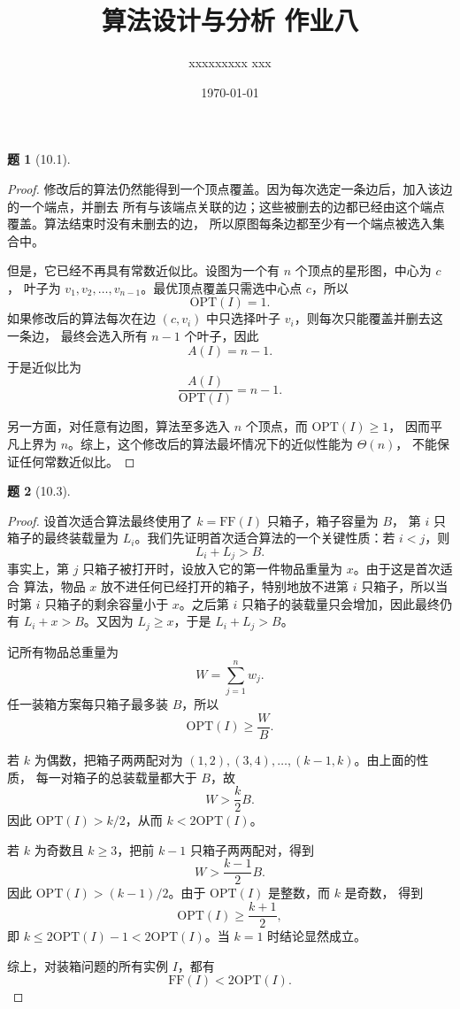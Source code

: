 \documentclass[11pt, a4paper]{article}
\title{算法设计与分析 作业八}
\author{xxxxxxxxx xxx}
\date{\today}
\newtheorem{problem}{题}
\begin{document}
\maketitle

\begin{problem}[10.1]
\end{problem}

\begin{proof}
    修改后的算法仍然能得到一个顶点覆盖。因为每次选定一条边后，加入该边的一个端点，并删去
    所有与该端点关联的边；这些被删去的边都已经由这个端点覆盖。算法结束时没有未删去的边，
    所以原图每条边都至少有一个端点被选入集合中。

    但是，它已经不再具有常数近似比。设图为一个有 $n$ 个顶点的星形图，中心为 $c$，
    叶子为 $v_1,v_2,\ldots,v_{n-1}$。最优顶点覆盖只需选中心点 $c$，所以
    \[
        \mathrm{OPT}(I)=1.
    \]
    如果修改后的算法每次在边 $(c,v_i)$ 中只选择叶子 $v_i$，则每次只能覆盖并删去这一条边，
    最终会选入所有 $n-1$ 个叶子，因此
    \[
        A(I)=n-1.
    \]
    于是近似比为
    \[
        \frac{A(I)}{\mathrm{OPT}(I)}=n-1.
    \]

    另一方面，对任意有边图，算法至多选入 $n$ 个顶点，而 $\mathrm{OPT}(I)\ge 1$，
    因而平凡上界为 $n$。综上，这个修改后的算法最坏情况下的近似性能为 $\Theta(n)$，
    不能保证任何常数近似比。
\end{proof}

\vspace{1em}

\begin{problem}[10.3]
\end{problem}

\begin{proof}
    设首次适合算法最终使用了 $k=\mathrm{FF}(I)$ 只箱子，箱子容量为 $B$，
    第 $i$ 只箱子的最终装载量为 $L_i$。我们先证明首次适合算法的一个关键性质：若
    $i<j$，则
    \[
        L_i+L_j>B.
    \]
    事实上，第 $j$ 只箱子被打开时，设放入它的第一件物品重量为 $x$。由于这是首次适合
    算法，物品 $x$ 放不进任何已经打开的箱子，特别地放不进第 $i$ 只箱子，所以当时第
    $i$ 只箱子的剩余容量小于 $x$。之后第 $i$ 只箱子的装载量只会增加，因此最终仍有
    $L_i+x>B$。又因为 $L_j\ge x$，于是 $L_i+L_j>B$。

    记所有物品总重量为
    \[
        W=\sum_{j=1}^n w_j.
    \]
    任一装箱方案每只箱子最多装 $B$，所以
    \[
        \mathrm{OPT}(I)\ge \frac{W}{B}.
    \]

    若 $k$ 为偶数，把箱子两两配对为 $(1,2),(3,4),\ldots,(k-1,k)$。由上面的性质，
    每一对箱子的总装载量都大于 $B$，故
    \[
        W>\frac{k}{2}B.
    \]
    因此 $\mathrm{OPT}(I)>k/2$，从而 $k<2\mathrm{OPT}(I)$。

    若 $k$ 为奇数且 $k\ge 3$，把前 $k-1$ 只箱子两两配对，得到
    \[
        W>\frac{k-1}{2}B.
    \]
    因此 $\mathrm{OPT}(I)>(k-1)/2$。由于 $\mathrm{OPT}(I)$ 是整数，而 $k$ 是奇数，
    得到
    \[
        \mathrm{OPT}(I)\ge \frac{k+1}{2},
    \]
    即 $k\le 2\mathrm{OPT}(I)-1<2\mathrm{OPT}(I)$。当 $k=1$ 时结论显然成立。

    综上，对装箱问题的所有实例 $I$，都有
    \[
        \mathrm{FF}(I)<2\mathrm{OPT}(I).
    \]
\end{proof}
\end{document}
